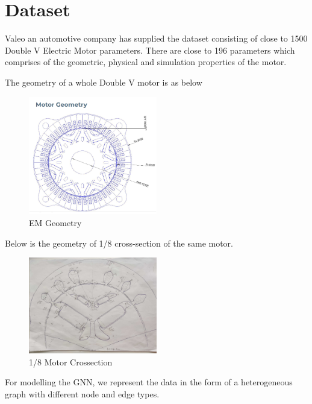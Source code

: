 \documentclass[a4paper,12pt]{article}
\begin{document}
\newpage 

\section*{Dataset} 

Valeo an automotive company has supplied the dataset consisting of close to 1500 Double V Electric Motor parameters. 
There are close to 196 parameters which comprises of the geometric, physical and simulation properties of the motor.

The geometry of a whole Double V motor is as below

\begin{figure}[h]
    \centering
    \includegraphics[width=0.5\textwidth]{./ReportImages/FullMotor.png} 
    \caption{EM Geometry}
    \label{fig:Full Motor(Supplied by Valeo)}
\end{figure}

Below is the geometry of 1/8 cross-section of the same motor.

\begin{figure}[h]
    \centering
    \includegraphics[width=0.5\textwidth]{./ReportImages/EMCrosssection.jpg} 
    \caption{1/8 Motor Crossection}
    \label{fig:1/8 Motor Crossection}
\end{figure}

\newpage 

For modelling the GNN, we represent the data in the form of a heterogeneous graph with different node and edge types.\\
\end{document}
